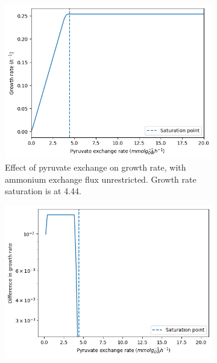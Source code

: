 \begin{figure}
  \begin{subfigure}[t]{0.45\textwidth}
  \centering
    \includegraphics[width=\linewidth]{saturation_pyr}
    \caption{
      Effect of pyruvate exchange on growth rate, with ammonium exchange flux unrestricted.
      Growth rate saturation is at \SI{4.44}{\mmolgdwh}.
    }
    \label{fig:model-saturation-pyruvate}
  \end{subfigure}%
  \begin{subfigure}[t]{0.45\textwidth}
  \centering
    \includegraphics[width=\linewidth]{saturation_diff_pyr}
    \caption{
    }
    \label{fig:model-saturation-diff-pyruvate}
  \end{subfigure}


\end{figure}
